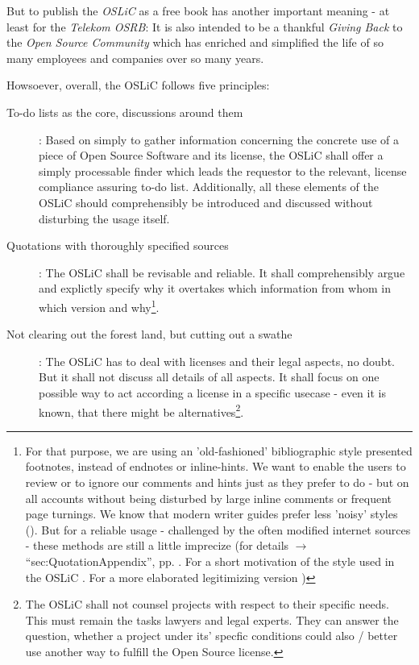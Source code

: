 But to publish the \emph{OSLiC} as a free book has another important meaning -
at least for the \emph{Telekom OSRB}: It is also intended to be a thankful
\emph{Giving Back} to the \emph{Open Source Community} which has enriched and
simplified the life of so many employees and companies over so many years.

Howsoever, overall, the OSLiC follows five principles:

\begin{description}
  \item[To-do lists as the core, discussions around them]: Based on simply to
  gather information concerning the concrete use of a piece of Open Source
  Software and its license, the OSLiC shall offer a simply processable finder
  which leads the requestor to the relevant, license compliance assuring to-do
  list. Additionally, all these elements of the OSLiC should comprehensibly
  be introduced and discussed without disturbing the usage itself.

  \item[Quotations with thoroughly specified sources]\label{QuotationPrinciple}:
  The OSLiC shall be revisable and reliable. It shall comprehensibly argue and
  explictly specify why it overtakes which information from whom in which
  version and why\footnote{For that purpose, we are using an 'old-fashioned'
  bibliographic style presented footnotes, instead of endnotes or inline-hints.
  We want to enable the users to review or to ignore our comments and hints just
  as they prefer to do - but on all accounts without being disturbed by large
  inline comments or frequent page turnings. We know that modern writer guides
  prefer less 'noisy' styles (\cite[pars pro toto cf.][\nopage
  passim]{Mla2009a}). But for a reliable usage - challenged by the often
  modified internet sources - these methods are still a little imprecize (for
  details $\rightarrow$ \enquote{sec:QuotationAppendix}, pp.
  \pageref{sec:QuotationAppendix} . For a short motivation of the style used in
  the OSLiC \cite[cf.][\nopage passim]{Reincke2012a}. For a more elaborated
  legitimizing version \cite[cf.][\nopage passim]{Reincke2012b}) }.

 \item[Not clearing out the forest land, but cutting out a swathe]: The OSLiC
  has to deal with licenses and their legal aspects, no doubt. But it shall not
  discuss all details of all aspects. It shall focus on one possible way to act
  according a license in a specific usecase - even it is known, that there might
  be alternatives\footnote{The OSLiC shall not counsel projects with respect to
  their specific needs. This must remain the tasks lawyers and legal experts.
  They can answer the question, whether a project under its' specfic conditions
  could also / better use another way to fulfill the Open Source license.}.
  

\end{description}
